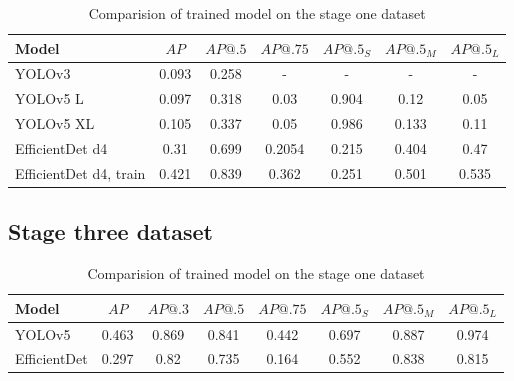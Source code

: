 \begin{table}
    \centering
    \begin{tabular}{l|c|c|c|c|c|c}
        Model                  & $AP$  & $AP@.5$ & $AP@.75$ & $AP@.5_S$ & $AP@.5_M$ & $AP@.5_L$ \\ \hline
        YOLOv3                 & 0.093 & 0.258   & -        & -         & -         & -         \\ \hline
        YOLOv5 L               & 0.097 & 0.318   & 0.03     & 0.904     & 0.12      & 0.05      \\ \hline
        YOLOv5 XL              & 0.105 & 0.337   & 0.05     & 0.986     & 0.133     & 0.11      \\ \hline
        EfficientDet d4        & 0.31  & 0.699   & 0.2054   & 0.215     & 0.404     & 0.47      \\ \hline
        EfficientDet d4, train & 0.421 & 0.839   & 0.362    & 0.251     & 0.501     & 0.535     \\ \hline
    \end{tabular}
    \caption{Comparision of trained model on the stage one dataset}
    \label{tab:model_results:stage_two}
\end{table}

\subsection{Stage three dataset}

\begin{table}
    \centering
    \begin{tabular}{l|c|c|c|c|c|c|c}
        Model        & $AP$  & $AP@.3$ & $AP@.5$ & $AP@.75$ & $AP@.5_S$ & $AP@.5_M$ & $AP@.5_L$ \\ \hline
        YOLOv5       & 0.463 & 0.869   & 0.841   & 0.442    & 0.697     & 0.887     & 0.974     \\ \hline
        EfficientDet & 0.297 & 0.82    & 0.735   & 0.164    & 0.552     & 0.838     & 0.815     \\ \hline
    \end{tabular}
    \caption{Comparision of trained model on the stage one dataset}
    \label{tab:model_results:stage_three:train}
\end{table}

